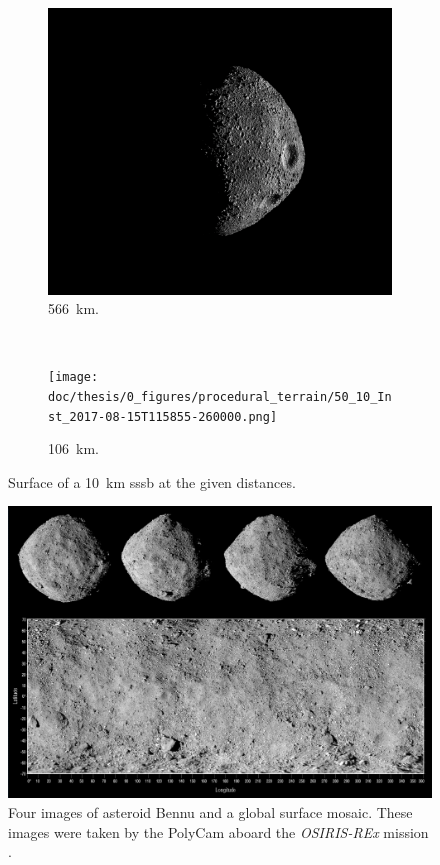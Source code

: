 \begin{figure}[htb]
    \centering
        \begin{subfigure}[b]{0.48\textwidth}
            \centering
                \includegraphics[width=\textwidth]{doc/thesis/0_figures/procedural_terrain/50_10_Inst_2017-08-15T115755-845000.png}
            \caption{\SI{566}{\kilo\meter}.}
            \label{fig:render_quali_comparison_1}
        \end{subfigure}
        \\
        \begin{subfigure}[b]{0.48\textwidth}
            \centering
                \texttt{[image: doc/thesis/0\_figures/procedural\_terrain/50\_10\_Inst\_2017-08-15T115855-260000.png]}
            \caption{\SI{106}{\kilo\meter}.}
            \label{fig:render_quali_comparison_2}
        \end{subfigure}
    \caption{Surface of a \SI{10}{\kilo\meter} \gls{sssb} at the given distances.}
    \label{fig:render_quali_comparison}
\end{figure}

\begin{figure}[htb]
    \centering
    \includegraphics[width=.8\textwidth]{doc/thesis/0_figures/procedural_terrain/2963_Bennu.png}
    \caption{Four images of asteroid Bennu and a global surface mosaic. These images were taken by the PolyCam aboard the \textit{OSIRIS-REx} mission \cite{FourExploration}.}
    \label{fig:render_quali_bennu}
\end{figure}

